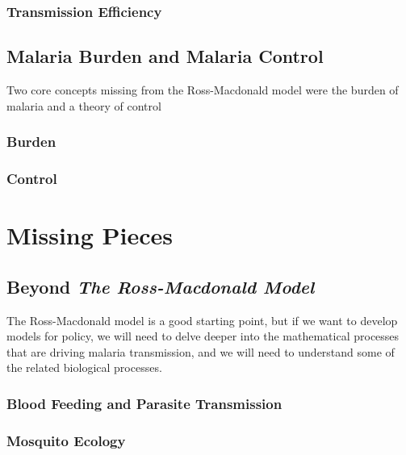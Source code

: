 \documentclass[
]{book}
\begin{document}
\section{Transmission Efficiency}\label{transmission-efficiency}

\chapter{Malaria Burden and Malaria Control}\label{malaria-burden-and-malaria-control}

Two core concepts missing from the Ross-Macdonald model were the burden of malaria and a theory of control

\section{Burden}\label{burden}

\section{Control}\label{control}

\part{Missing Pieces}\label{part-missing-pieces}

\chapter{\texorpdfstring{Beyond \emph{The Ross-Macdonald Model}}{Beyond The Ross-Macdonald Model}}\label{beyond-the-ross-macdonald-model}

The Ross-Macdonald model is a good starting point, but if we want to develop models for policy, we will need to delve deeper into the mathematical processes that are driving malaria transmission, and we will need to understand some of the related biological processes.

\section{Blood Feeding and Parasite Transmission}\label{blood-feeding-and-parasite-transmission}

\section{Mosquito Ecology}\label{mosquito-ecology}
\end{document}
